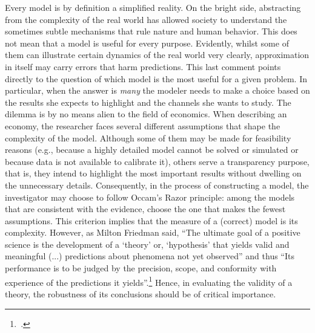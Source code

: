 \documentclass[english, a4paper, 12pt]{article}
\begin{document}
Every model is by definition a simplified reality. On the bright side, abstracting from the complexity of the real world has allowed society to understand the sometimes subtle mechanisms that rule nature and human behavior. This does not mean that a model is useful for every purpose. Evidently, whilst some of them can illustrate certain dynamics of the real world very clearly, approximation in itself may carry errors that harm predictions. This last comment points directly to the question of which model is the most useful for a given problem. In particular, when the answer is \textit{many} the modeler needs to make a choice based on the results she expects to highlight and the channels she wants to study. The dilemma is by no means alien to the field of economics. When describing an economy, the researcher faces several different assumptions that shape the complexity of the model. Although some of them may be made for feasibility reasons (e.g., because a highly detailed model cannot be solved or simulated or because data is not available to calibrate it), others serve a transparency purpose, that is, they intend to highlight the most important results without dwelling on the unnecessary details. Consequently, in the process of constructing a model, the investigator may choose to follow Occam's Razor principle: among the models that are consistent with the evidence, choose the one that makes the fewest assumptions. This criterion implies that the measure of a (correct) model is its complexity. However, as Milton Friedman said, ``The ultimate goal of a positive science is the development of a `theory' or, `hypothesis' that yields valid and meaningful (...) predictions about phenomena not yet observed'' and thus ``Its performance is to be judged by the precision, scope, and conformity with experience of the predictions it yields''.\footnote{\,\cite{FriedmanPositive}.} Hence, in evaluating the validity of a theory, the robustness of its conclusions should be of critical importance.
\end{document}
